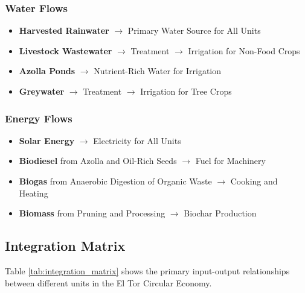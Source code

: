 \subsubsection{Water Flows}
\begin{itemize}
    \item \textbf{Harvested Rainwater} $\rightarrow$ Primary Water Source for All Units
    \item \textbf{Livestock Wastewater} $\rightarrow$ Treatment $\rightarrow$ Irrigation for Non-Food Crops
    \item \textbf{Azolla Ponds} $\rightarrow$ Nutrient-Rich Water for Irrigation
    \item \textbf{Greywater} $\rightarrow$ Treatment $\rightarrow$ Irrigation for Tree Crops
\end{itemize}

\subsubsection{Energy Flows}
\begin{itemize}
    \item \textbf{Solar Energy} $\rightarrow$ Electricity for All Units
    \item \textbf{Biodiesel} from Azolla and Oil-Rich Seeds $\rightarrow$ Fuel for Machinery
    \item \textbf{Biogas} from Anaerobic Digestion of Organic Waste $\rightarrow$ Cooking and Heating
    \item \textbf{Biomass} from Pruning and Processing $\rightarrow$ Biochar Production
\end{itemize}

\subsection{Integration Matrix}

Table \ref{tab:integration_matrix} shows the primary input-output relationships between different units in the El Tor Circular Economy.

